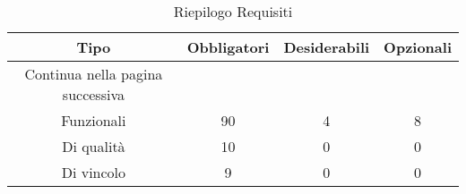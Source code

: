 \begin{center}
    \renewcommand{\arraystretch}{2.2}
    
    \begin{longtable}{ c c c c }
        
        \rowcolor[HTML]{232f3e}
    
        \rowcolors{3}{tableRow}{}
        \color[HTML]{FFFFFF} \textbf{Tipo} & \color[HTML]{FFFFFF} \centering\textbf{Obbligatori} & \color[HTML]{FFFFFF} \centering\textbf{Desiderabili} & \color[HTML]{FFFFFF} \textbf{Opzionali} \\
    \endhead
    
     \rowcolor{white}\multicolumn{3}{c}
   { Continua nella pagina successiva} \\
   \endfoot
   \caption [Riepilogo Requisiti]{Riepilogo Requisiti}
	\label{tabella:TracReqF}
   \endlastfoot
        Funzionali & 90 & 4 & 8 \\
        Di qualità & 10 & 0 & 0 \\
        Di vincolo & 9 & 0 & 0 \\
        
    \end{longtable}
    
    \end{center}